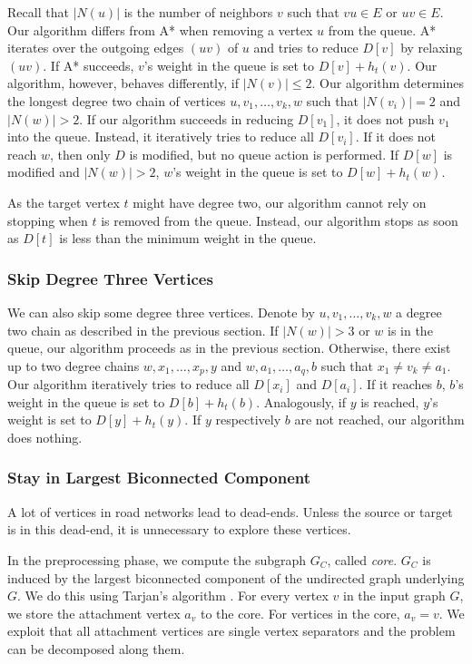 \documentclass[manuscript,review]{acmart}
\begin{document}
Recall that $|N(u)|$ is the number of neighbors $v$ such that $vu \in E$ or $uv \in E$.
Our algorithm differs from A* when removing a vertex $u$ from the queue.
A* iterates over the outgoing edges $(uv)$ of $u$ and tries to reduce $D[v]$ by relaxing $(uv)$.
If A* succeeds, $v$'s weight in the queue is set to $D[v]+h_t(v)$.
Our algorithm, however, behaves differently, if $|N(v)|\le 2$.
Our algorithm determines the longest degree two chain of vertices $u, v_1,\ldots, v_k, w$ such that $|N(v_i)|=2$ and $|N(w)| > 2$.
If our algorithm succeeds in reducing $D[v_1]$, it does not push $v_1$ into the queue.
Instead, it iteratively tries to reduce all $D[v_i]$.
If it does not reach $w$, then only $D$ is modified, but no queue action is performed.
If $D[w]$ is modified and $|N(w)|>2$, $w$'s weight in the queue is set to $D[w]+h_t(w)$.

As the target vertex $t$ might have degree two, our algorithm cannot rely on stopping when $t$ is removed from the queue.
Instead, our algorithm stops as soon as $D[t]$ is less than the minimum weight in the queue.

\subsubsection{Skip Degree Three Vertices}

We can also skip some degree three vertices.
Denote by $u, v_1,\ldots, v_k, w$ a degree two chain as described in the previous section.
If $|N(w)| > 3$ or $w$ is in the queue, our algorithm proceeds as in the previous section.
Otherwise, there exist up to two degree chains $w, x_1,\ldots,x_p, y$ and $w,a_1,\ldots,a_q,b$ such that $x_1\neq v_k \neq a_1$.
Our algorithm iteratively tries to reduce all $D[x_i]$ and $D[a_i]$.
If it reaches $b$, $b$'s weight in the queue is set to $D[b]+h_t(b)$.
Analogously, if $y$ is reached, $y$'s weight is set to $D[y]+h_t(y)$.
If $y$ respectively $b$ are not reached, our algorithm does nothing.

\subsubsection{Stay in Largest Biconnected Component}\label{sec:largested-biconnected-component}

A lot of vertices in road networks lead to dead-ends.
Unless the source or target is in this dead-end, it is unnecessary to explore these vertices.

In the preprocessing phase, we compute the subgraph $G_C$, called \emph{core}.
$G_C$ is induced by the largest biconnected component of the undirected graph underlying $G$.
We do this using Tarjan's algorithm \cite{t-dfslg2-72}.
For every vertex $v$ in the input graph $G$, we store the attachment vertex $a_v$ to the core.
For vertices in the core, $a_v=v$.
We exploit that all attachment vertices are single vertex separators and the problem can be decomposed along them.
\end{document}
